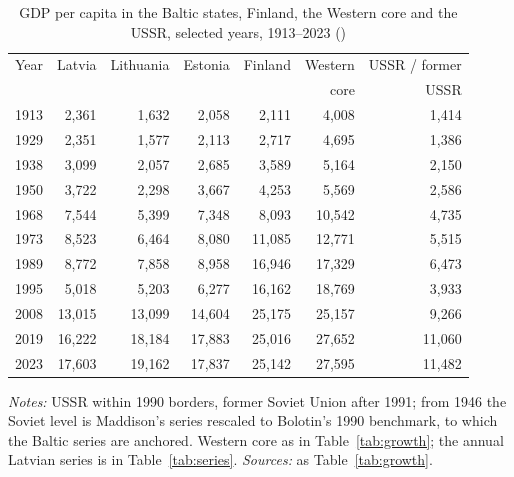 \begin{table}[htbp]
\centering\footnotesize
\caption{GDP per capita in the Baltic states, Finland, the Western core and the USSR, selected years, 1913--2023 (\intlnineteen{})}
\label{tab:levels}
\begin{threeparttable}
\begin{tabular}{lrrrrrr}
\toprule
Year & Latvia & Lithuania & Estonia & Finland & Western & USSR / former \\
& & & & & core & USSR \\
\midrule
1913 & 2,361 & 1,632 & 2,058 & 2,111 & 4,008 & 1,414 \\
1929 & 2,351 & 1,577 & 2,113 & 2,717 & 4,695 & 1,386 \\
1938 & 3,099 & 2,057 & 2,685 & 3,589 & 5,164 & 2,150 \\
\midrule
1950 & 3,722 & 2,298 & 3,667 & 4,253 & 5,569 & 2,586 \\
1968 & 7,544 & 5,399 & 7,348 & 8,093 & 10,542 & 4,735 \\
1973 & 8,523 & 6,464 & 8,080 & 11,085 & 12,771 & 5,515 \\
1989 & 8,772 & 7,858 & 8,958 & 16,946 & 17,329 & 6,473 \\
\midrule
1995 & 5,018 & 5,203 & 6,277 & 16,162 & 18,769 & 3,933 \\
2008 & 13,015 & 13,099 & 14,604 & 25,175 & 25,157 & 9,266 \\
2019 & 16,222 & 18,184 & 17,883 & 25,016 & 27,652 & 11,060 \\
2023 & 17,603 & 19,162 & 17,837 & 25,142 & 27,595 & 11,482 \\
\bottomrule
\end{tabular}
\begin{tablenotes}
\footnotesize
\textit{Notes:} USSR within 1990 borders, former Soviet Union after 1991; from 1946 the Soviet level is Maddison's series rescaled to Bolotin's 1990 benchmark, to which the Baltic series are anchored. Western core as in Table~\ref{tab:growth}; the annual Latvian series is in Table~\ref{tab:series}. \textit{Sources:} as Table~\ref{tab:growth}.
\end{tablenotes}
\end{threeparttable}
\end{table}
